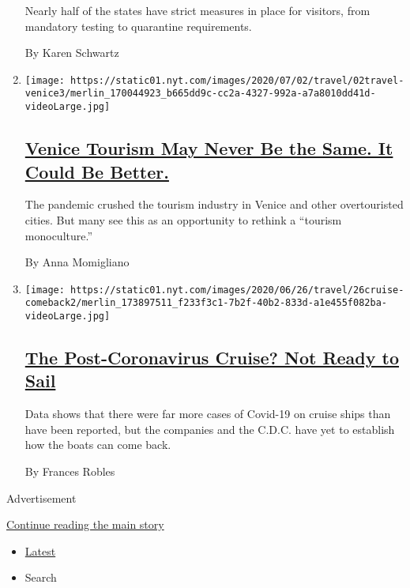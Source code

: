 \begin{enumerate}
  Nearly half of the states have strict measures in place for visitors,
  from mandatory testing to quarantine requirements.

  By Karen Schwartz
\item
  \texttt{[image: https://static01.nyt.com/images/2020/07/02/travel/02travel-venice3/merlin\_170044923\_b665dd9c-cc2a-4327-992a-a7a8010dd41d-videoLarge.jpg]}

  \hypertarget{venice-tourism-may-never-be-the-same-it-could-be-better}{%
  \subsection{\texorpdfstring{\href{/2020/07/02/travel/venice-coronavirus-tourism.html}{Venice
  Tourism May Never Be the Same. It Could Be
  Better.}}{Venice Tourism May Never Be the Same. It Could Be Better.}}\label{venice-tourism-may-never-be-the-same-it-could-be-better}}

  The pandemic crushed the tourism industry in Venice and other
  overtouristed cities. But many see this as an opportunity to rethink a
  ``tourism monoculture.''

  By Anna Momigliano
\item
  \texttt{[image: https://static01.nyt.com/images/2020/06/26/travel/26cruise-comeback2/merlin\_173897511\_f233f3c1-7b2f-40b2-833d-a1e455f082ba-videoLarge.jpg]}

  \hypertarget{the-post-coronavirus-cruise-not-ready-to-sail}{%
  \subsection{\texorpdfstring{\href{/2020/06/26/travel/coronavirus-cruises-reopening.html}{The
  Post-Coronavirus Cruise? Not Ready to
  Sail}}{The Post-Coronavirus Cruise? Not Ready to Sail}}\label{the-post-coronavirus-cruise-not-ready-to-sail}}

  Data shows that there were far more cases of Covid-19 on cruise ships
  than have been reported, but the companies and the C.D.C. have yet to
  establish how the boats can come back.

  By Frances Robles
\end{enumerate}

Advertisement

\protect\hyperlink{after-mid1}{Continue reading the main story}

\begin{itemize}
\tightlist
\item
  \protect\hyperlink{stream-panel}{Latest}
\item
  Search
\end{itemize}

